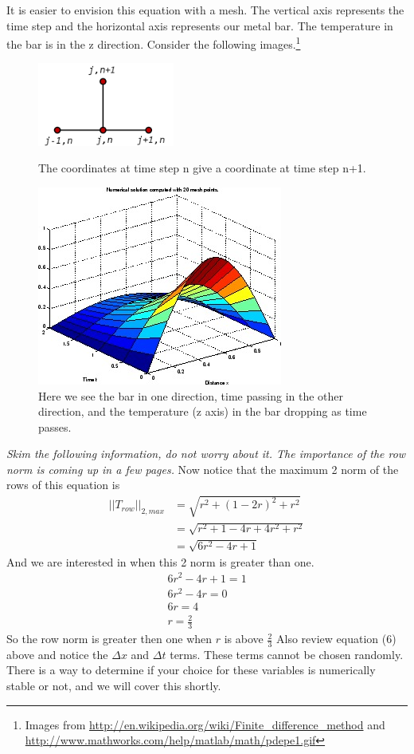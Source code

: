\documentclass[a4paper]{article}
\begin{document}
 It is easier to envision this equation with a mesh. The vertical axis represents the time step and the horizontal axis represents our metal bar. The temperature in the bar is in the z direction. Consider the following images.\footnote{Images from \url{http://en.wikipedia.org/wiki/Finite_difference_method} and \url{http://www.mathworks.com/help/matlab/math/pdepe1.gif}}
 
\begin{figure}
\begin{center}
\includegraphics[width=0.4\textwidth]{forward.png}
\caption{The coordinates at time step n give a coordinate at time step n+1.}
\vspace{10pt}
\includegraphics[scale = 0.4]{heat.jpg}
\caption{Here we see the bar in one direction, time passing in  the other direction, and the temperature (z axis) in the bar dropping as time passes.}
\end{center}
\vspace{-100pt}
\end{figure}

\emph{Skim the following information, do not worry about it. The importance of the row norm is coming up in a few pages.} Now notice that the maximum 2 norm of the rows of this equation is 
\begin{align}
||T_{row}||_{2, max}&=\sqrt{r^2 + (1-2r)^2 + r ^ 2}\\
&=\sqrt{r^2 + 1 - 4r + 4r^2 + r^2}\\
&=\sqrt{6r^2 - 4r + 1}
\end{align}
And we are interested in when this 2 norm is greater than one.
\begin{gather}
6r^2 - 4r + 1 = 1\\
6r^2 - 4r = 0\\
6r = 4\\
r = \frac23
\end{gather}
So the row norm is greater then one when $r$ is above $\frac23$
Also review equation (6) above and notice the $\Delta x $ and $\Delta t$ terms. These terms cannot be chosen randomly. There is a way to determine if your choice for these variables is numerically stable or not, and we will cover this shortly.
\end{document}
